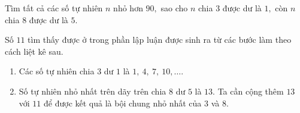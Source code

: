 \begin{bx}
Tìm tất cả các số tự nhiên $n$ nhỏ hơn $90,$ sao cho $n$ chia $3$ được dư là $1,$ còn $n$ chia $8$ được dư là $5.$

\begin{luuy}
Số $11$ tìm thấy được ở trong phần lập luận được sinh ra từ các bước làm theo cách liệt kê sau.
\begin{enumerate}
    \item Các số tự nhiên chia $3$ dư $1$ là $1,\ 4,\ 7,\ 10,\ldots.$
    \item Số tự nhiên nhỏ nhất trên dãy trên chia $8$ dư $5$ là $13.$ Ta cần cộng thêm $13$ với $11$ để được kết quả là bội chung nhỏ nhất của $3$ và $8.$
\end{enumerate}
\end{luuy}
\end{bx}

